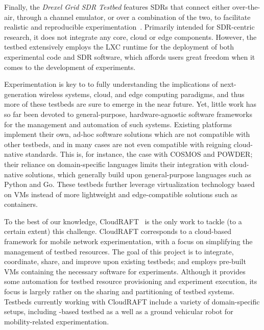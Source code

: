 Finally, the \emph{Drexel Grid \ac{SDR} Testbed} features \acp{SDR} that connect either over-the-air, through a channel emulator, or over a combination of the two, to facilitate realistic and reproducible experimentation~\cite{DrexelGrid}.
Primarily intended for \ac{SDR}-centric research, it does not integrate any core, cloud or edge components.
However, the testbed extensively employs the \ac{LXC} runtime for the deployment of both experimental code and \ac{SDR} software, which affords users great freedom when it comes to the development of experiments.

Experimentation is key to to fully understanding the implications of next-generation wireless systems, cloud, and edge computing paradigms, and thus more of these testbeds are sure to emerge in the near future.
Yet, little work has so far been devoted to general-purpose, hardware-agnostic software frameworks for the management and automation of such systems.
Existing platforms implement their own, ad-hoc software solutions which are not compatible with other testbeds, and in many cases are not even compatible with reigning cloud-native standards.
This is, for instance, the case with \ac{COSMOS} and \ac{POWDER}; their reliance on domain-specific languages limits their integration with cloud-native solutions, which generally build upon general-purpose languages such as Python and Go.
These testbeds further leverage virtualization technology based on \acp{VM} instead of more lightweight and edge-compatible solutions such as containers.

To the best of our knowledge, CloudRAFT~\cite{cloudraft} is the only work to tackle (to a certain extent) this challenge.
CloudRAFT corresponds to a cloud-based framework for mobile network experimentation, with a focus on simplifying the management of testbed resources.
The goal of this project is to integrate, coordinate, share, and improve upon existing testbeds; and employs pre-built \acp{VM} containing the necessary software for experiments.
Although it provides some automation for testbed resource provisioning and experiment execution, its focus is largely rather on the sharing and partitioning of testbed systems.
Testbeds currently working with CloudRAFT include a variety of domain-specific setups, including -based testbed as a well as a ground vehicular robot for mobility-related experimentation.

